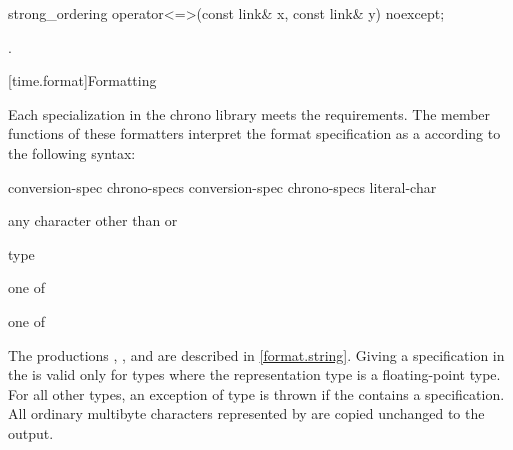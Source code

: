 %
\begin{itemdecl}
strong_ordering operator<=>(const link& x, const link& y) noexcept;
\end{itemdecl}

\begin{itemdescr}
\pnum
\returns
{}.
\end{itemdescr}

[time.format]{Formatting}

\pnum
Each  specialization
in the chrono library
meets the  requirements.
The  member functions of these formatters
interpret the format specification
as a 
according to the following syntax:

\begin{ncbnf}
\br
       
\end{ncbnf}

\begin{ncbnf}
\br
    conversion-spec\br
    chrono-specs conversion-spec\br
    chrono-specs literal-char
\end{ncbnf}

\begin{ncbnf}
\br
    \textnormal{any character other than \tcode{\{} or \tcode{\}}}
\end{ncbnf}

\begin{ncbnf}
\br
    \terminal{\%}  type
\end{ncbnf}

\begin{ncbnf}
 \textnormal{one of}\br
\end{ncbnf}

\begin{ncbnf}
 \textnormal{one of}\br
    \br
\end{ncbnf}

The productions
,
, and
are described in \ref{format.string}.
Giving a  specification
in the 
is valid only for  types
where the representation type 
is a floating-point type.
For all other  types,
an exception of type  is thrown
if the 
contains a  specification.
All ordinary multibyte characters
represented by 
are copied unchanged to the output.

